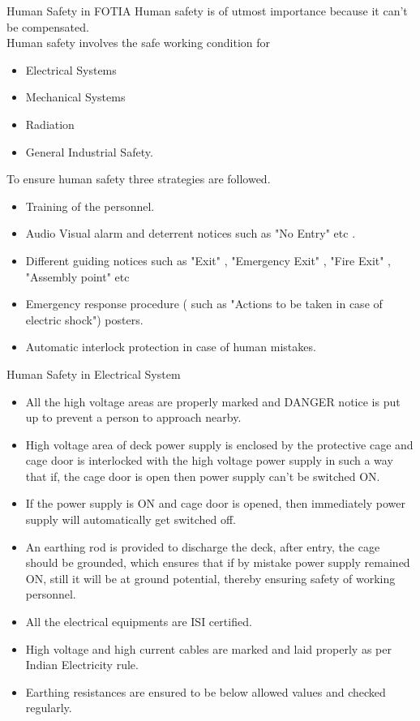 \documentclass[11pt]{beamer}
\begin{document}
\begin{frame}{Human Safety in FOTIA}
Human safety is of utmost importance because it can’t be compensated.\\
	
Human safety involves the safe working condition for 
 \begin{itemize} 
 \item Electrical Systems
 \item Mechanical Systems
 \item Radiation 
 \item General Industrial Safety.
\end{itemize}		
To ensure human safety three strategies are followed. 
\begin{itemize}
\item Training of the personnel.
\item Audio Visual alarm and deterrent notices such as "No Entry" etc .
\item Different guiding notices such as "Exit" , "Emergency Exit" , "Fire Exit" , "Assembly point" etc
\item Emergency response procedure ( such as "Actions to be taken in case of electric shock") posters.  
\item Automatic interlock protection in case of human mistakes. 
\end{itemize}	 
 
\end{frame}

\begin{frame}{Human Safety in Electrical System}

 \begin{itemize} 
 \item All the high voltage areas are properly marked and DANGER notice is put up to prevent a person to approach nearby.
\item High voltage area of  deck power supply is enclosed by the protective cage and cage door is interlocked with the high voltage power supply in such a way that if, the cage door is open then power supply can’t be switched ON.
\item If the power supply is ON and cage door is opened, then immediately power supply will automatically get switched off.
\item An earthing rod is provided to discharge the deck, after entry, the cage should be grounded, which ensures that if by mistake power supply remained ON, still it will be at ground potential, thereby ensuring safety of working personnel. 
\item All the electrical equipments are ISI certified.
 \item High voltage and high current cables are marked and laid properly as per Indian Electricity rule.
\item Earthing resistances are ensured to be below allowed values and checked regularly. 
\end{itemize}		
	 
 
\end{frame}
\end{document}
